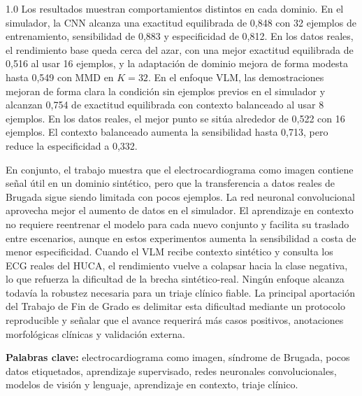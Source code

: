\begin{spacing}{1.0}
Los resultados muestran comportamientos distintos en cada dominio. En el simulador, la CNN alcanza una exactitud equilibrada de 0,848 con 32 ejemplos de entrenamiento, sensibilidad de 0,883 y especificidad de 0,812. En los datos reales, el rendimiento base queda cerca del azar, con una mejor exactitud equilibrada de 0,516 al usar 16 ejemplos, y la adaptación de dominio mejora de forma modesta hasta 0,549 con MMD en \(K=32\). En el enfoque VLM, las demostraciones mejoran de forma clara la condición sin ejemplos previos en el simulador y alcanzan 0,754 de exactitud equilibrada con contexto balanceado al usar 8 ejemplos. En los datos reales, el mejor punto se sitúa alrededor de 0,522 con 16 ejemplos. El contexto balanceado aumenta la sensibilidad hasta 0,713, pero reduce la especificidad a 0,332.

En conjunto, el trabajo muestra que el electrocardiograma como imagen contiene señal útil en un dominio sintético, pero que la transferencia a datos reales de Brugada sigue siendo limitada con pocos ejemplos. La red neuronal convolucional aprovecha mejor el aumento de datos en el simulador. El aprendizaje en contexto no requiere reentrenar el modelo para cada nuevo conjunto y facilita su traslado entre escenarios, aunque en estos experimentos aumenta la sensibilidad a costa de menor especificidad. Cuando el VLM recibe contexto sintético y consulta los ECG reales del HUCA, el rendimiento vuelve a colapsar hacia la clase negativa, lo que refuerza la dificultad de la brecha sintético-real. Ningún enfoque alcanza todavía la robustez necesaria para un triaje clínico fiable. La principal aportación del Trabajo de Fin de Grado es delimitar esta dificultad mediante un protocolo reproducible y señalar que el avance requerirá más casos positivos, anotaciones morfológicas clínicas y validación externa.

\textbf{Palabras clave:} electrocardiograma como imagen, síndrome de Brugada, pocos datos etiquetados, aprendizaje supervisado, redes neuronales convolucionales, modelos de visión y lenguaje, aprendizaje en contexto, triaje clínico.

\end{spacing}
